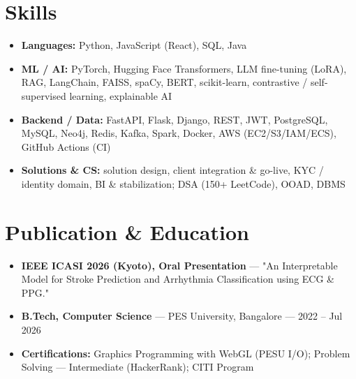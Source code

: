 \documentclass[10pt,a4paper]{article}
\begin{document}
\section*{Skills}
\begin{itemize}
\item \textbf{Languages:} Python, JavaScript (React), SQL, Java
\item \textbf{ML / AI:} PyTorch, Hugging Face Transformers, LLM fine-tuning (LoRA), RAG, LangChain, FAISS, spaCy, BERT, scikit-learn, contrastive / self-supervised learning, explainable AI
\item \textbf{Backend / Data:} FastAPI, Flask, Django, REST, JWT, PostgreSQL, MySQL, Neo4j, Redis, Kafka, Spark, Docker, AWS (EC2/S3/IAM/ECS), GitHub Actions (CI)
\item \textbf{Solutions \& CS:} solution design, client integration \& go-live, KYC / identity domain, BI \& stabilization; DSA (150+ LeetCode), OOAD, DBMS
\end{itemize}
\section*{Publication \& Education}
\begin{itemize}
\item \textbf{IEEE ICASI 2026 (Kyoto), Oral Presentation} --- "An Interpretable Model for Stroke Prediction and Arrhythmia Classification using ECG \& PPG."
\item \textbf{B.Tech, Computer Science} --- PES University, Bangalore --- 2022 -- Jul 2026
\item \textbf{Certifications:} Graphics Programming with WebGL (PESU I/O); Problem Solving --- Intermediate (HackerRank); CITI Program
\end{itemize}
\end{document}

